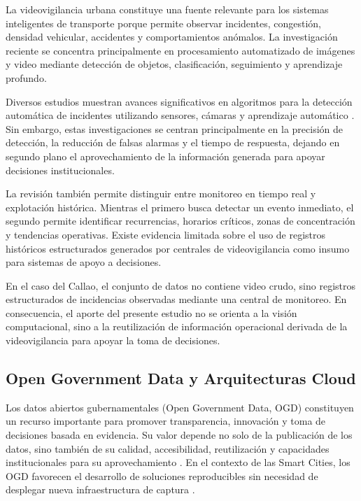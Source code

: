 \documentclass[]{IEEEphot}
\begin{document}
La videovigilancia urbana constituye una fuente relevante para los sistemas inteligentes de transporte porque permite observar incidentes, congestión, densidad vehicular, accidentes y comportamientos anómalos. La investigación reciente se concentra principalmente en procesamiento automatizado de imágenes y video mediante detección de objetos, clasificación, seguimiento y aprendizaje profundo.

Diversos estudios muestran avances significativos en algoritmos para la detección automática de incidentes utilizando sensores, cámaras y aprendizaje automático \cite{elsahly2022traffic,xia2022vehicle}. Sin embargo, estas investigaciones se centran principalmente en la precisión de detección, la reducción de falsas alarmas y el tiempo de respuesta, dejando en segundo plano el aprovechamiento de la información generada para apoyar decisiones institucionales.

La revisión también permite distinguir entre monitoreo en tiempo real y explotación histórica. Mientras el primero busca detectar un evento inmediato, el segundo permite identificar recurrencias, horarios críticos, zonas de concentración y tendencias operativas. Existe evidencia limitada sobre el uso de registros históricos estructurados generados por centrales de videovigilancia como insumo para sistemas de apoyo a decisiones.

En el caso del Callao, el conjunto de datos no contiene video crudo, sino registros estructurados de incidencias observadas mediante una central de monitoreo. En consecuencia, el aporte del presente estudio no se orienta a la visión computacional, sino a la reutilización de información operacional derivada de la videovigilancia para apoyar la toma de decisiones.

\subsection{Open Government Data y Arquitecturas Cloud}

Los datos abiertos gubernamentales (Open Government Data, OGD) constituyen un recurso importante para promover transparencia, innovación y toma de decisiones basada en evidencia. Su valor depende no solo de la publicación de los datos, sino también de su calidad, accesibilidad, reutilización y capacidades institucionales para su aprovechamiento \cite{wirtz2022opengov}. En el contexto de las Smart Cities, los OGD favorecen el desarrollo de soluciones reproducibles sin necesidad de desplegar nueva infraestructura de captura \cite{mishra2025internet}.
\end{document}
